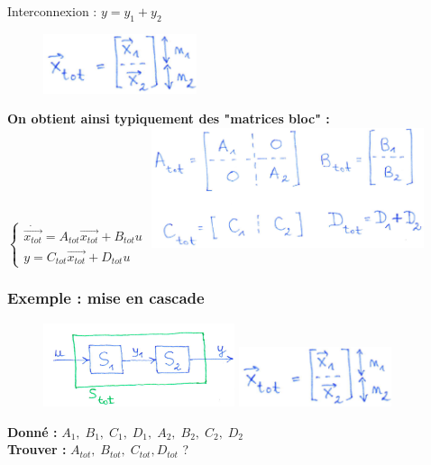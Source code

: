 \documentclass[document.tex]{subfiles}
\begin{document}
Interconnexion : $y = y_1 + y_2$

\begin{figure}[H]
    \centering
    \includegraphics[width=0.4\textwidth]{Include/Figure/26.png}
\end{figure}

\textbf{On obtient ainsi typiquement des "matrices bloc" : }\\


$
\begin{cases}
	\dot{\vec{x_{tot}}} = A_{tot}\vec{x_{tot}} + B_{tot} u \\
	y = C_{tot}\vec{x_{tot}} + D_{tot}u
\end{cases}
$
\hfill
\includegraphics[width=0.6\textwidth]{Include/Figure/28.png}\\


\subsubsection{Exemple : mise en cascade}
\begin{figure}[H]
    \centering
    \includegraphics[width=0.5\textwidth]{Include/Figure/29.png} \hfill
    \hfill \includegraphics[width=0.4\textwidth]{Include/Figure/26.png}
\end{figure}

\begin{flushleft}
\textbf{Donné : } $A_1,\;B_1,\;C_1,\;D_1,\;A_2,\;B_2,\;C_2,\;D_2$\\
\textbf{Trouver :} $ A_{tot}, \;B_{tot}, \;C_{tot}, D_{tot}$ ? \\
\end{flushleft}
\end{document}
